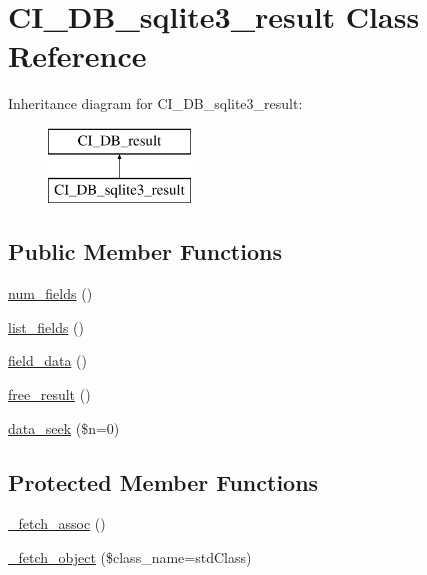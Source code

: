 \hypertarget{class_c_i___d_b__sqlite3__result}{}\section{C\+I\+\_\+\+D\+B\+\_\+sqlite3\+\_\+result Class Reference}
\label{class_c_i___d_b__sqlite3__result}
Inheritance diagram for C\+I\+\_\+\+D\+B\+\_\+sqlite3\+\_\+result\+:\begin{figure}[H]
\begin{center}
\leavevmode
\includegraphics[height=2.000000cm]{class_c_i___d_b__sqlite3__result}
\end{center}
\end{figure}
\subsection*{Public Member Functions}
\begin{DoxyCompactItemize}
\item 
\mbox{\hyperlink{class_c_i___d_b__sqlite3__result_af831bf363e4d7d661a717a4932af449d}{num\+\_\+fields}} ()
\item 
\mbox{\hyperlink{class_c_i___d_b__sqlite3__result_a50b54eb4ea7cfd039740f532988ea776}{list\+\_\+fields}} ()
\item 
\mbox{\hyperlink{class_c_i___d_b__sqlite3__result_a84bffd65e53902ade1591716749a33e3}{field\+\_\+data}} ()
\item 
\mbox{\hyperlink{class_c_i___d_b__sqlite3__result_aad2d98d6beb3d6095405356c6107b473}{free\+\_\+result}} ()
\item 
\mbox{\hyperlink{class_c_i___d_b__sqlite3__result_a8255ae91816e4206e29eb7581c5af0f1}{data\+\_\+seek}} (\$n=0)
\end{DoxyCompactItemize}
\subsection*{Protected Member Functions}
\begin{DoxyCompactItemize}
\item 
\mbox{\hyperlink{class_c_i___d_b__sqlite3__result_a43a9a92817f1334a1c10752ec44275a0}{\+\_\+fetch\+\_\+assoc}} ()
\item 
\mbox{\hyperlink{class_c_i___d_b__sqlite3__result_a60806be6a9c2488820813c2a7f4fef71}{\+\_\+fetch\+\_\+object}} (\$class\+\_\+name=\textquotesingle{}std\+Class\textquotesingle{})
\end{DoxyCompactItemize}
